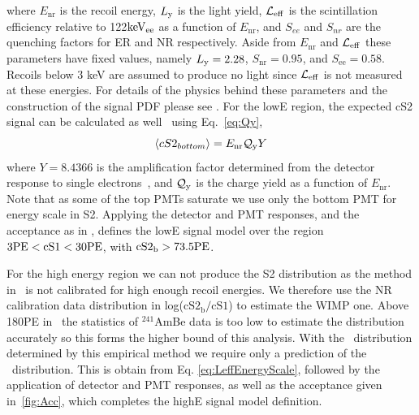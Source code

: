 %
%
%

where $E_\mathrm{nr}$ is the recoil energy, $L_{\mathrm{y}}$ is the light yield, $\mathcal{L}_{\mathrm{eff}}$ is the scintillation efficiency relative to 122$\mathrm{keV_{ee}}$ as a function of $E_\mathrm{nr}$, and $S_{ee}$ and $S_{nr}$ are the quenching factors for ER and NR respectively. Aside from $E_\mathrm{nr}$ and $\mathcal{L}_{\mathrm{eff}}$ these parameters have fixed values, namely $L_{\mathrm{y}} = 2.28$, $S_\mathrm{nr} = 0.95$, and $S_\mathrm{ee} = 0.58$. Recoils below 3 keV are assumed to produce no light since $\mathcal{L}_{\mathrm{eff}}$ is not measured at these energies. For details of the physics behind these parameters and the construction of the signal PDF please see \cite{xe100_ana2012,xe100_run_combination}. For the lowE region, the expected cS2 signal can be calculated as well~\cite{DataMCXenon} using Eq.~\ref{eq:Qy},
%
\begin{equation}
\label{eq:Qy}
	\langle cS2_{bottom} \rangle = E_{\mathrm{nr}}\mathcal{Q}_{\mathrm{y}} Y   
\end{equation}
%
where $Y = 8.4366$ is the amplification factor determined from the detector response to single electrons~\cite{XenonSingleElectron}, and $\mathcal{Q}_{\mathrm{y}}$ is the charge yield as a function of $E_\mathrm{nr}$. Note that as some of the top PMTs saturate we use only the bottom PMT for energy scale in S2.  Applying the detector and PMT responses, and the acceptance as in \cite{xe100_run_combination}, defines the lowE signal model over the region $3 \mathrm{PE} < \mathrm{cS1} < 30 \mathrm{PE}$, with $\mathrm{cS2}_\mathrm{b} > 73.5 \mathrm{PE}$.

For the high energy region we can not produce the S2 distribution as the method in~\cite{DataMCXenon} is not calibrated for high enough recoil energies. We therefore use the NR calibration data distribution in log($\mathrm{cS2_b/cS1}$) to estimate the WIMP one. Above 180PE in \cSi\ the statistics of $^{241}$AmBe data is too low to estimate the distribution accurately so this forms the higher bound of this analysis. With the \cSiib\ distribution determined by this empirical method we require only a prediction of the \cSi\ distribution. This is obtain from Eq. \ref{eq:LeffEnergyScale}, followed by the application of detector and PMT responses, as well as the acceptance given in~\ref{fig:Acc}, which completes the highE signal model definition.

